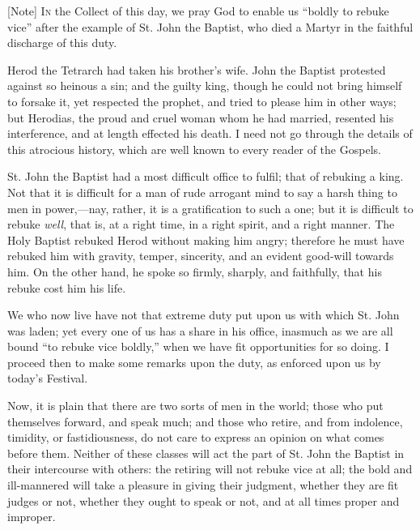 [Note] I\textsc{n} the Collect of this day,
we pray God to enable us ``boldly to rebuke vice'' after the
example of St. John the Baptist, who died a Martyr in the faithful
discharge of this duty.

Herod the Tetrarch had taken his brother's wife. John the Baptist
protested against so heinous a sin; and the guilty king, though he could
not bring himself to forsake it, yet respected the prophet, and tried to
please him in other ways; but Herodias, the proud and cruel woman whom
he had married, resented his interference, and at length effected his
death. I need not go through the details of this atrocious history,
which are well known to every reader of the Gospels.

St. John the Baptist had a most difficult office to fulfil; that of
rebuking a king. Not that it is difficult for a man of rude arrogant
mind to say a harsh thing to men in power,—nay, rather, it is a
gratification to such a one; but it is difficult to rebuke \emph{well},
that is, at a right time, in a right spirit, and a right manner. The
Holy Baptist rebuked Herod without making him angry; therefore he must
have rebuked him with gravity, temper, sincerity, and an evident
good-will towards him. On the other hand, he spoke so firmly, sharply,
and faithfully, that his rebuke cost him his life.

We who now live have not that extreme duty put upon us with which St.
John was laden; yet every one of us has a share in his office, inasmuch
as we are all bound ``to rebuke vice boldly,'' when we have fit
opportunities for so doing. I proceed then to make some remarks upon the
duty, as enforced upon us by today's Festival.

Now, it is plain that there are two sorts of men in the world; those
who put themselves forward, and speak much; and those who retire, and
from indolence, timidity, or fastidiousness, do not care to express an
opinion on what comes before them. Neither of these classes will act the
part of St. John the Baptist in their intercourse with others: the
retiring will not rebuke vice at all; the bold and ill-mannered will
take a pleasure in giving their judgment, whether they are fit judges or
not, whether they ought to speak or not, and at all times proper and
improper.

